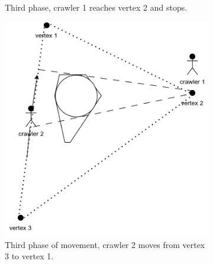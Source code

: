 \begin{figure}[h!]
\begin{subfigure}[t]{0.27\linewidth}
		\caption{Third phase, crawler 1 reaches vertex 2 and stops.}
		\label{fig:triangle_5}
	\end{subfigure}
	\hfill
	\begin{subfigure}[t]{0.27\linewidth}
		\centering
		\includegraphics[width=\linewidth]{graphics/triangle_6.png}
		\caption{Third phase of movement, crawler 2 moves from vertex 3 to vertex 1.}
		\label{fig:triangle_6}
	\end{subfigure}
	\hfill
	\begin{subfigure}[t]{0.27\linewidth}
		\centering

\end{subfigure}
\end{figure}
